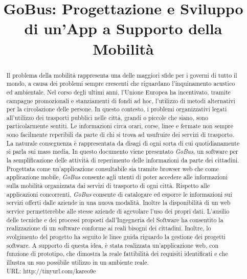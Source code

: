 \documentclass[conference]{IEEEtran}
\begin{document}
\title{GoBus: Progettazione e Sviluppo di un\rq App a Supporto della Mobilit\`{a}}

\author{}


\maketitle


\begin{abstract}
Il problema della mobilit\`{a} rappresenta una delle maggiori sfide per i governi di tutto il mondo, a causa dei problemi sempre crescenti che riguardano l\rq inquinamento acustico ed ambientale. Nel corso degli ultimi anni, l\rq Unione Europea ha incentivato, tramite campagne promozionali e stanziamenti di fondi ad hoc, l\rq utilizzo di metodi alternativi per la circolazione delle persone. In questo contesto, i problemi organizzativi legati all\rq utilizzo dei trasporti pubblici nelle citt\`{a}, grandi o piccole che siano, sono particolarmente sentiti. Le informazioni circa orari, corse, linee e fermate non sempre sono facilmente reperibili da parte di chi si trova ad usufruire dei servizi di trasporto. La naturale conseguenza \`{e} rappresentata da disagi di ogni sorta di cui quotidianamente si parla sui mass media. In questo documento viene presentato \emph{GoBus}, un software per la semplificazione delle attivit\`{a} di reperimento delle informazioni da parte dei cittadini. Progettata come un\rq applicazione consultabile sia tramite browser web che come applicazione mobile, \emph{GoBus} consente agli utenti di poter accedere alle informazioni sulla mobilit\`{a} organizzata dai servizi di trasporto di ogni citt\`{a}. Rispetto alle applicazioni concorrenti, \emph{GoBus} consente di catalogare ed esporre le informazioni sui servizi offerti dalle aziende in una nuova modalit\`{a}. Inoltre  la disponibilit\`{a} di un web service permetterebbe alle stesse aziende di agevolare l\rq uso dei propri dati. L\rq ausilio delle tecniche e dei processi proposti dall\rq Ingegneria del Software ha consentito la realizzazione di un software conforme ai reali bisogni dei cittadini. Inoltre, lo svolgimento del progetto ha seguito le linee guida riguardo la gestione dei progetti software. A supporto di questa idea, \`{e} stata realizzata un\rq applicazione web, con funzione di prototipo, che dimostra la reale fattibilit\`{a} dei requisiti identificati e che illustra un suo possibile utilizzo in un ambiente reale.\\
URL: http://tinyurl.com/kareo9e
\end{abstract}
\end{document}
